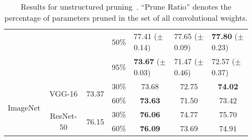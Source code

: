 \begin{table}[!htbp]
{\begin{tabular}{c|c|ccccc}
                                               &                                  &                                    & 50\%        & \multicolumn{1}{l}{77.41 ($\pm$0.14)}       & \multicolumn{1}{l}{77.65 ($\pm$0.09)}       & \multicolumn{1}{l}{\textbf{77.80} ($\pm$0.23)}                        \\                                       &                                  &                                    & 95\%        & \multicolumn{1}{l}{\textbf{73.67} ($\pm$0.03)}       & \multicolumn{1}{l}{71.47 ($\pm$0.46)}       & \multicolumn{1}{l}{72.57 ($\pm$0.37)}                        \\ \hline
\multirow{4}{*}{ImageNet}      
& \multirow{2}{*}{VGG-16}          & \multirow{2}{*}{73.37}             & 30\%        & \multicolumn{1}{c}{73.68}                        & \multicolumn{1}{c}{72.75}                        & \multicolumn{1}{c}{\textbf{74.02}}                        \\ 
                                              &                                  &                                    & 60\%        & \multicolumn{1}{c}{\textbf{73.63}}                        & \multicolumn{1}{c}{71.50}                        & \multicolumn{1}{c}{73.42}                        \\
                                              \cline{2-7} 
                                               & \multirow{2}{*}{ResNet-50}       & \multirow{2}{*}{76.15}             & 30\%            & \multicolumn{1}{c}{\textbf{76.06}}                        & \multicolumn{1}{c}{74.77}                        & \multicolumn{1}{c}{75.70}                        \\
                                              &                                  &                                    &    60\%         & \multicolumn{1}{c}{\textbf{76.09}}                        & \multicolumn{1}{c}{73.69}                        & \multicolumn{1}{c}{74.91}                        \\
                                               \hline
\end{tabular}
}
\caption{Results for unstructured pruning~\cite{han2015learning}. ``Prune Ratio'' denotes the percentage of parameters pruned in the set of all convolutional weights. }
\label{weight-level}
\end{table}

